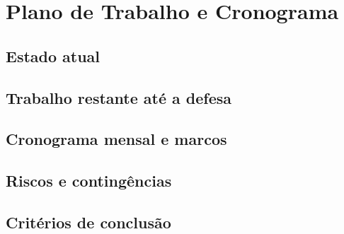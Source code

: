 \chapter{Plano de Trabalho e Cronograma}
\label{ch:plano-trabalho}


\section{Estado atual}

\section{Trabalho restante até a defesa}

\section{Cronograma mensal e marcos}

\section{Riscos e contingências}

\section{Critérios de conclusão}
